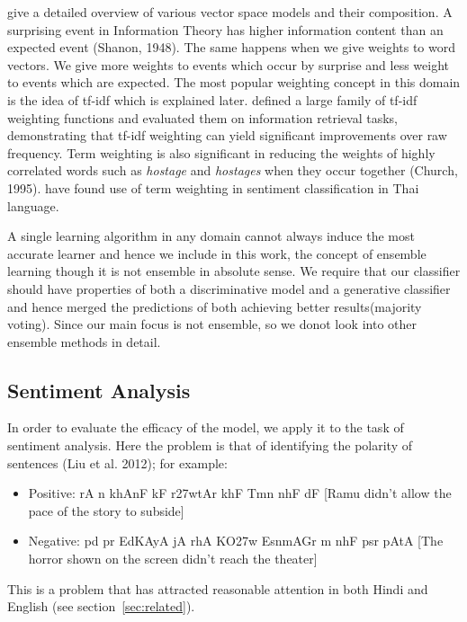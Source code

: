 \cite{Turney:10} give a detailed overview of various vector space models and their composition. A surprising event in Information Theory has higher information content than an expected event (Shanon, 1948). The same happens when we give weights to word vectors. We give more weights to events which occur by surprise and less weight to events which are expected. The most popular weighting concept in this domain is the idea of tf-idf which is explained later. \cite{Salton:88} defined a large family of tf-idf weighting functions and evaluated them on information retrieval tasks, demonstrating that tf-idf weighting can yield significant improvements over raw frequency. Term weighting is also significant in reducing the weights of highly correlated words such as \emph{hostage} and \emph{hostages} when they occur together (Church, 1995). \cite{Chirawichitchai:14} have found use of term weighting in sentiment classification in Thai language.

A single learning algorithm in any domain cannot always induce the most accurate learner and hence we include in this work, the concept of ensemble learning though it is not ensemble in absolute sense. We require that our classifier should have properties of both a discriminative model and a generative classifier and hence merged the predictions of both achieving better results(majority voting). Since our main focus is not ensemble, so we donot look into other ensemble methods in detail.

\subsection{Sentiment Analysis}
In order to evaluate the efficacy of the model, we apply it to the task of sentiment analysis. Here the problem is that of identifying the polarity of sentences (Liu et al. 2012); for example: 
\begin{itemize}
\item Positive: {\dn rA n\? khAnF kF r\327wtAr khF{\qva} Tmn\? nhF{\qva} dF} [Ramu didn't allow the pace of the story to subside]
\item Negative: {\dn pd\?{\qvb} pr EdKAyA jA rhA KO\327w Esn\?mAGr m\?
nhF{\qva} psr pAtA} [The horror shown on the screen didn't reach the theater]
\end{itemize}

This is a problem that has attracted reasonable attention in both Hindi and English (see section~\ref{sec:related}). 

